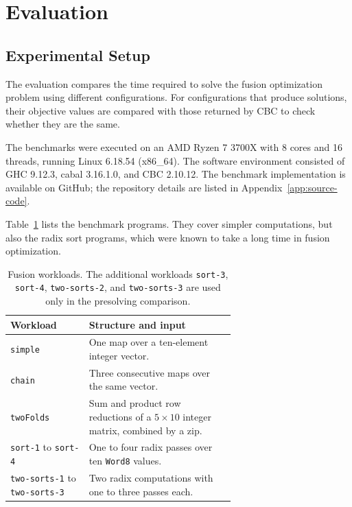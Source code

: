 \section{Evaluation}
\label{sec:evaluation}

\subsection{Experimental Setup}

The evaluation compares the time required to solve the fusion optimization problem using different configurations.
For configurations that produce solutions, their objective values are compared with those returned by CBC to check whether they are the same.

The benchmarks were executed on an AMD Ryzen 7 3700X with 8 cores and 16 threads, running Linux 6.18.54 (x86\_64).
The software environment consisted of GHC 9.12.3, cabal 3.16.1.0, and CBC 2.10.12.
The benchmark implementation is available on GitHub; the repository details are listed in Appendix~\ref{app:source-code}.

Table~\ref{tab:evaluation-workloads} lists the benchmark programs.
They cover simpler computations, but also the radix sort programs, which were known to take a long time in fusion optimization.

\begin{table}[htbp]
    \centering
    \small
    \begin{tabular}{@{}lp{0.65\linewidth}@{}}
        \hline
        Workload & Structure and input \\
        \hline
        \texttt{simple} & One map over a ten-element integer vector. \\
        \texttt{chain} & Three consecutive maps over the same vector. \\
        \texttt{twoFolds} & Sum and product row reductions of a $5\times10$ integer matrix, combined by a zip. \\
        \texttt{sort-1} to \texttt{sort-4} & One to four radix passes over ten \texttt{Word8} values. \\
        \texttt{two-sorts-1} to \texttt{two-sorts-3} & Two radix computations with one to three passes each. \\
        \hline
    \end{tabular}
    \caption{Fusion workloads. The additional workloads \texttt{sort-3}, \texttt{sort-4}, \texttt{two-sorts-2}, and \texttt{two-sorts-3} are used only in the presolving comparison.}
    \label{tab:evaluation-workloads}
\end{table}

